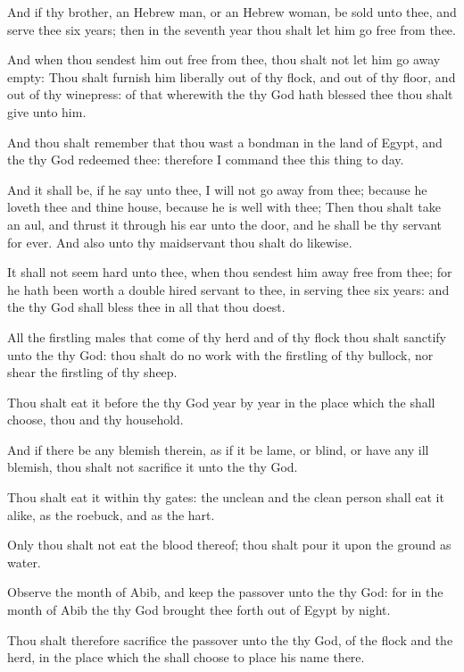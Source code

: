 \Verse And if thy brother, an Hebrew man, or an Hebrew woman, be sold unto thee, and serve thee six years; then in the seventh year thou shalt let him go free from thee.

\Verse And when thou sendest him out free from thee, thou shalt not let him go away empty: \Verse Thou shalt furnish him liberally out of thy flock, and out of thy floor, and out of thy winepress: of that wherewith the \LORD thy God hath blessed thee thou shalt give unto him.

\Verse And thou shalt remember that thou wast a bondman in the land of Egypt, and the \LORD thy God redeemed thee: therefore I command thee this thing to day.

\Verse And it shall be, if he say unto thee, I will not go away from thee; because he loveth thee and thine house, because he is well with thee; \Verse Then thou shalt take an aul, and thrust it through his ear unto the door, and he shall be thy servant for ever. And also unto thy maidservant thou shalt do likewise.

\Verse It shall not seem hard unto thee, when thou sendest him away free from thee; for he hath been worth a double hired servant to thee, in serving thee six years: and the \LORD thy God shall bless thee in all that thou doest.

\Verse All the firstling males that come of thy herd and of thy flock thou shalt sanctify unto the \LORD thy God: thou shalt do no work with the firstling of thy bullock, nor shear the firstling of thy sheep.

\Verse Thou shalt eat it before the \LORD thy God year by year in the place which the \LORD shall choose, thou and thy household.

\Verse And if there be any blemish therein, as if it be lame, or blind, or have any ill blemish, thou shalt not sacrifice it unto the \LORD thy God.

\Verse Thou shalt eat it within thy gates: the unclean and the clean person shall eat it alike, as the roebuck, and as the hart.

\Verse Only thou shalt not eat the blood thereof; thou shalt pour it upon the ground as water.


\Chapter
\Verse Observe the month of Abib, and keep the passover unto the \LORD thy God: for in the month of Abib the \LORD thy God brought thee forth out of Egypt by night.

\Verse Thou shalt therefore sacrifice the passover unto the \LORD thy God, of the flock and the herd, in the place which the \LORD shall choose to place his name there.

